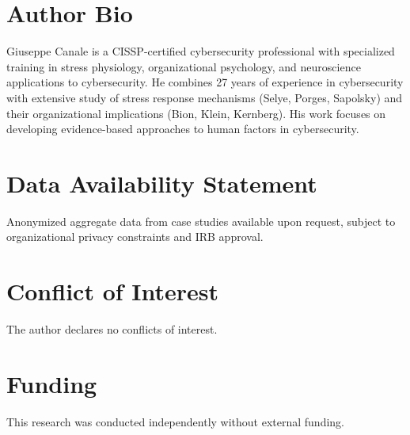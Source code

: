 \documentclass[11pt,a4paper]{article}
\begin{document}
\section*{Author Bio}

Giuseppe Canale is a CISSP-certified cybersecurity professional with specialized training in stress physiology, organizational psychology, and neuroscience applications to cybersecurity. He combines 27 years of experience in cybersecurity with extensive study of stress response mechanisms (Selye, Porges, Sapolsky) and their organizational implications (Bion, Klein, Kernberg). His work focuses on developing evidence-based approaches to human factors in cybersecurity.

\section*{Data Availability Statement}

Anonymized aggregate data from case studies available upon request, subject to organizational privacy constraints and IRB approval.

\section*{Conflict of Interest}

The author declares no conflicts of interest.

\section*{Funding}

This research was conducted independently without external funding.
\end{document}
